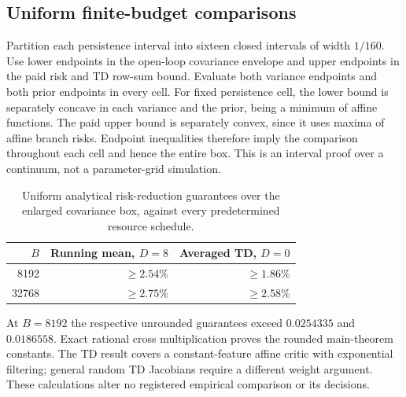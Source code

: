 \subsection{Uniform finite-budget comparisons}
Partition each persistence interval into sixteen closed intervals of width $1/160$.
Use lower endpoints in the open-loop covariance envelope and upper endpoints in the paid risk and TD row-sum bound.
Evaluate both variance endpoints and both prior endpoints in every cell.
For fixed persistence cell, the lower bound is separately concave in each variance and the prior, being a minimum of affine functions.
The paid upper bound is separately convex, since it uses maxima of affine branch risks.
Endpoint inequalities therefore imply the comparison throughout each cell and hence the entire box.
This is an interval proof over a continuum, not a parameter-grid simulation.

\begin{table}[t]
\centering
\caption{Uniform analytical risk-reduction guarantees over the enlarged covariance box, against every predetermined resource schedule.}
\label{tab:wide-td}
\begin{tabular}{rrr}
\toprule
$B$ & Running mean, $D=8$ & Averaged TD, $D=0$\\
\midrule
8192 & $\ge2.54\%$ & $\ge1.86\%$\\
32768 & $\ge2.75\%$ & $\ge2.58\%$\\
\bottomrule
\end{tabular}
\end{table}

At $B=8192$ the respective unrounded guarantees exceed $0.0254335$ and $0.0186558$.
Exact rational cross multiplication proves the rounded main-theorem constants.
The TD result covers a constant-feature affine critic with exponential filtering; general random TD Jacobians require a different weight argument.
These calculations alter no registered empirical comparison or its decisions.
